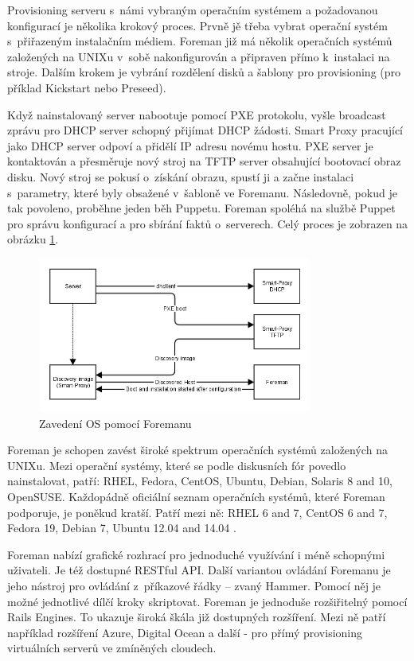 Provisioning serveru s~námi vybraným operačním systémem a požadovanou konfigurací je několika krokový proces. Prvně jě třeba vybrat operační systém s~přiřazeným instalačním médiem. Foreman již má několik operačních systémů založených na UNIXu v~sobě nakonfigurován a připraven přímo k~instalaci na stroje. Dalším krokem je vybrání rozdělení disků a šablony pro provisioning (pro příklad Kickstart nebo Preseed).

Když nainstalovaný server nabootuje pomocí PXE protokolu, vyšle broadcast zprávu pro DHCP server schopný přijímat DHCP žádosti. Smart Proxy pracující jako DHCP server odpoví a přidělí IP adresu novému hostu. PXE server je kontaktován a přesměruje nový stroj na TFTP server obsahující bootovací obraz disku. Nový stroj se pokusí o~získání obrazu, spustí ji a začne instalaci s~parametry, které byly obsažené v~šabloně ve Foremanu. Následovně, pokud je tak povoleno, proběhne jeden běh Puppetu. Foreman spoléhá na službě Puppet pro správu konfigurací a pro sbírání faktů o~serverech. Celý proces je zobrazen na obrázku \ref{foreman-arch-2}.

\begin{figure}[h]\centering
\includegraphics[width=0.8\textwidth]{files/discovery.png}
	\caption{Zavedení OS pomocí Foremanu \cite{foreman-arch2}}\label{foreman-arch-2}
\end{figure}


Foreman je schopen zavést široké spektrum operačních systémů založených na UNIXu. Mezi operační systémy, které se podle diskusních fór povedlo nainstalovat, patří: RHEL, Fedora, CentOS, Ubuntu, Debian, Solaris 8 and 10, OpenSUSE. Každopádně oficiální seznam operačních systémů, které Foreman podporuje, je poněkud kratší. Patří mezi ně: RHEL 6 and 7, CentOS 6 and 7, Fedora 19, Debian 7, Ubuntu 12.04 and 14.04 \cite{foreman-support-os}.

Foreman nabízí grafické rozhrací pro jednoduché využívání i méně schopnými uživateli. Je též dostupné RESTful API. Další variantou ovládání Foremanu je jeho nástroj pro ovládání z~příkazové řádky -- zvaný Hammer. Pomocí něj je možné jednotlivé dílčí kroky skriptovat. Foreman je jednoduše rozšiřitelný pomocí Rails Engines. To ukazuje široká škála již dostupných rozšíření. Mezi ně patří například rozšíření Azure, Digital Ocean a další - pro přímý provisioning virtuálních serverů ve zmíněných cloudech.

